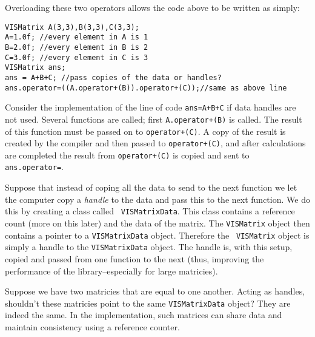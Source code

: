 Overloading these two operators allows the code above to
be written as simply:
\begin{list}{}{\setlength{\partopsep}{-1in}
\setlength{\topsep}{0in} \setlength{\labelwidth}{1in}
\setlength{\leftmargin}{0.5in} \setlength{\labelsep}{0.2in}}
 \item {\tt VISMatrix A(3,3),B(3,3),C(3,3);}\\
{\tt A=1.0f; //every element in A is 1}\\
{\tt B=2.0f; //every element in B is 2}\\
{\tt C=3.0f; //every element in C is 3}\\
{\tt VISMatrix ans;}\\
{\tt ans = A+B+C; //pass copies of the data or handles?}\\
{\tt ans.operator=((A.operator+(B)).operator+(C));//same as above line}
\end{list}
Consider the implementation of the line of code {\tt ans=A+B+C}
if data handles are not used.
Several functions are called; first {\tt A.operator+(B)} is called.
The result of this function must be passed on to {\tt operator+(C)}.
A copy of the result is created by the compiler and then passed to
{\tt operator+(C)}, and after calculations are completed 
the result from {\tt operator+(C)} is copied and sent to {\tt ans.operator=}.

Suppose that instead of coping all the data to send to the next 
function we let the computer copy a {\em handle} to the data and pass 
this to the next function.  We do this by creating a class called {\tt 
VISMatrixData}.  This class contains a reference count (more on this 
later) and the data of the matrix.  The {\tt VISMatrix} object then 
contains a pointer to a {\tt VISMatrixData} object.  Therefore the {\tt 
VISMatrix} object is simply a handle to the {\tt VISMatrixData} object.  The 
handle is, with this setup, copied and passed from one function to the 
next (thus, improving the performance of the library--especially for 
large matricies).

Suppose we have two matricies that are equal to one another.
Acting as handles, shouldn't these matricies point to the same
{\tt VISMatrixData} object?  They are indeed the same.  
In the implementation, such matrices can share data 
and maintain consistency using a reference counter.

